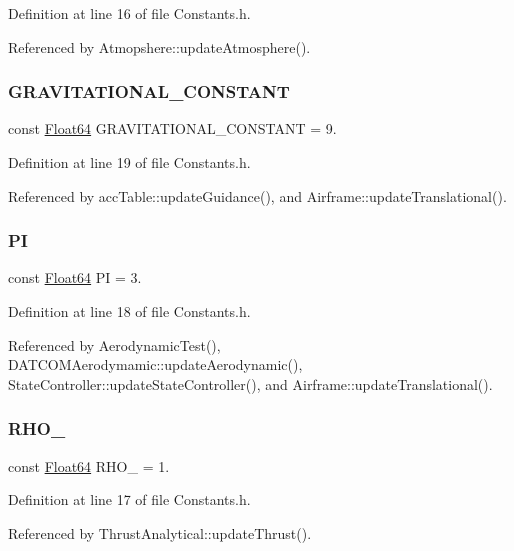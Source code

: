 Definition at line 16 of file Constants.\+h.



Referenced by Atmopshere\+::update\+Atmosphere().

\mbox{\label{group___tools_gad0d838a1206faf55a621d5ec8f1e896d}} 
\subsubsection{\texorpdfstring{G\+R\+A\+V\+I\+T\+A\+T\+I\+O\+N\+A\+L\+\_\+\+C\+O\+N\+S\+T\+A\+NT}{GRAVITATIONAL\_CONSTANT}}
{\footnotesize\ttfamily const \hyperlink{group___tools_ga3f1431cb9f76da10f59246d1d743dc2c}{Float64} G\+R\+A\+V\+I\+T\+A\+T\+I\+O\+N\+A\+L\+\_\+\+C\+O\+N\+S\+T\+A\+NT = 9.}



Definition at line 19 of file Constants.\+h.



Referenced by acc\+Table\+::update\+Guidance(), and Airframe\+::update\+Translational().

\mbox{\label{group___tools_gac3a28ac509d7e1dff951cc777889cc93}} 
\subsubsection{\texorpdfstring{PI}{PI}}
{\footnotesize\ttfamily const \hyperlink{group___tools_ga3f1431cb9f76da10f59246d1d743dc2c}{Float64} PI = 3.}



Definition at line 18 of file Constants.\+h.



Referenced by Aerodynamic\+Test(), D\+A\+T\+C\+O\+M\+Aerodymamic\+::update\+Aerodynamic(), State\+Controller\+::update\+State\+Controller(), and Airframe\+::update\+Translational().

\mbox{\label{group___tools_ga4350dd604b08011751eaca3d76213582}} 
\subsubsection{\texorpdfstring{R\+H\+O\+\_}{RHO\_0}}
{\footnotesize\ttfamily const \hyperlink{group___tools_ga3f1431cb9f76da10f59246d1d743dc2c}{Float64} R\+H\+O\+\_ = 1.}



Definition at line 17 of file Constants.\+h.



Referenced by Thrust\+Analytical\+::update\+Thrust().

